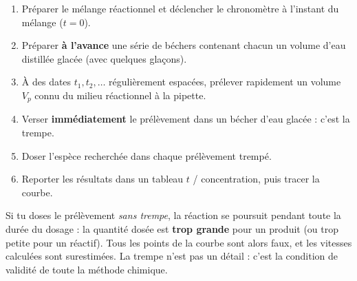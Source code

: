 \documentclass[11pt]{article}
\begin{document}
\begin{methode}
\begin{enumerate}
\item Préparer le mélange réactionnel et déclencher le chronomètre à l'instant du mélange ($t = 0$).
\item Préparer \textbf{à l'avance} une série de béchers contenant chacun un volume d'eau distillée glacée (avec quelques glaçons).
\item À des dates $t_1, t_2, \ldots$ régulièrement espacées, prélever rapidement un volume $V_p$ connu du milieu réactionnel à la pipette.
\item Verser \textbf{immédiatement} le prélèvement dans un bécher d'eau glacée : c'est la trempe.
\item Doser l'espèce recherchée dans chaque prélèvement trempé.
\item Reporter les résultats dans un tableau $t$ / concentration, puis tracer la courbe.
\end{enumerate}
\end{methode}

\begin{attention}
Si tu doses le prélèvement \emph{sans trempe}, la réaction se poursuit pendant toute la durée du dosage : la quantité dosée est \textbf{trop grande} pour un produit (ou trop petite pour un réactif). Tous les points de la courbe sont alors faux, et les vitesses calculées sont surestimées. La trempe n'est pas un détail : c'est la condition de validité de toute la méthode chimique.
\end{attention}
\end{document}
